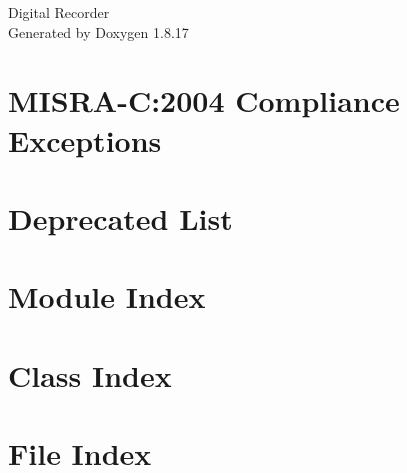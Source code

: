 \let\mypdfximage\pdfximage\def\pdfximage{\immediate\mypdfximage}\documentclass[twoside]{book}
\newcommand{\+}{\discretionary{\mbox{\scriptsize$\hookleftarrow$}}{}{}}
\newcommand{\clearemptydoublepage}{%
  \newpage{\pagestyle{empty}\cleardoublepage}%
}
\begin{document}
\hypersetup{pageanchor=false,
             bookmarksnumbered=true,
             pdfencoding=unicode
            }
\begin{titlepage}
\vspace*{7cm}
\begin{center}%
{\Large Digital Recorder }\\
\vspace*{1cm}
{\large Generated by Doxygen 1.8.17}\\
\end{center}
\end{titlepage}
\clearemptydoublepage
{}
\tableofcontents
\clearemptydoublepage
{}
\hypersetup{pageanchor=true}

\chapter{M\+I\+S\+R\+A-\/C\+:2004 Compliance Exceptions}
\label{CMSIS_MISRA_Exceptions}

\chapter{Deprecated List}
\label{deprecated}

\chapter{Module Index}

\chapter{Class Index}

\chapter{File Index}

\end{document}
